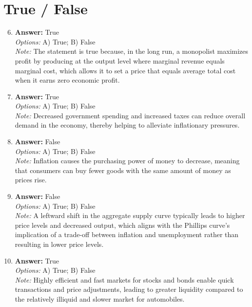 \documentclass[12pt]{article}
\begin{document}
\section*{True / False}
\begin{enumerate}[label=\arabic*.]
\setcounter{enumi}{5}
\item \textbf{Answer:} True
\\ \textit{Options:} A) True; B) False
\\ \textit{Note:} The statement is true because, in the long run, a monopolist maximizes profit by producing at the output level where marginal revenue equals marginal cost, which allows it to set a price that equals average total cost when it earns zero economic profit.
\item \textbf{Answer:} True
\\ \textit{Options:} A) True; B) False
\\ \textit{Note:} Decreased government spending and increased taxes can reduce overall demand in the economy, thereby helping to alleviate inflationary pressures.
\item \textbf{Answer:} False
\\ \textit{Options:} A) True; B) False
\\ \textit{Note:} Inflation causes the purchasing power of money to decrease, meaning that consumers can buy fewer goods with the same amount of money as prices rise.
\item \textbf{Answer:} False
\\ \textit{Options:} A) True; B) False
\\ \textit{Note:} A leftward shift in the aggregate supply curve typically leads to higher price levels and decreased output, which aligns with the Phillips curve's implication of a trade-off between inflation and unemployment rather than resulting in lower price levels.
\item \textbf{Answer:} True
\\ \textit{Options:} A) True; B) False
\\ \textit{Note:} Highly efficient and fast markets for stocks and bonds enable quick transactions and price adjustments, leading to greater liquidity compared to the relatively illiquid and slower market for automobiles.
\end{enumerate}
\end{document}
